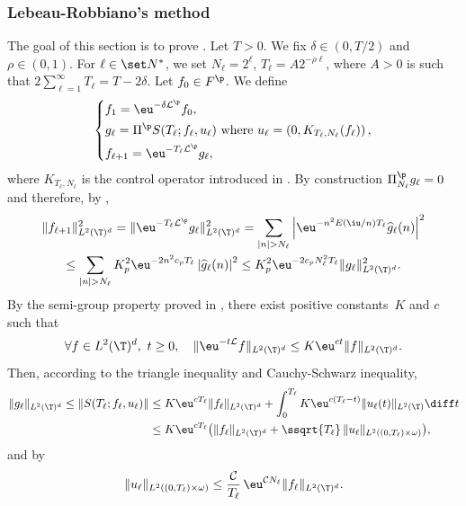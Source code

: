 \subsubsection{Lebeau-Robbiano's method} \label{Subsec:LR}

The goal of this section is to prove . Let $T>0$.
We fix $\delta \in (0,T/2)$ and $\rho \in (0,1)$.
For $\ell \in \set N^*$, we set $N_\ell=2^\ell$, $T_{\ell}=A2^{-\rho \ell}$, where $A>0$ is such that $2\sum_{\ell=1}^\infty T_\ell = T - 2\delta$.
Let $f_0 \in F^\p$. We define
\[
\left\lbrace\begin{aligned}
& f_1=\eu^{-\delta \mathcal{L}^\p} f_0, \\
& g_\ell = \Pi^\p S(T_\ell ; f_\ell, u_\ell) \text{ where } u_\ell = \left(0,K_{T_\ell,N_\ell}(f_\ell)\right), \\
& f_{\ell+1}=\eu^{-T_\ell \mathcal{L}^\p} g_\ell,
\end{aligned}\right.
\]
where $K_{T_\ell,N_\ell}$ is the control operator introduced in . By construction $\Pi^\p_{N_\ell} g_\ell=0$ and therefore, by ,
\begin{multline*}
\|f_{\ell+1}\|_{L^2(\T)^d}^2 = \| \eu^{-T_\ell \mathcal{L}^\p} g_\ell \|_{L^2(\T)^d}^2
= \sum_{|n|>N_\ell} \left\lvert \eu^{-n^2 E(\iu/n)T_\ell} \widehat{g}_\ell(n) \right\rvert^2 \\
\leq \sum_{|n|>N_\ell} K_p^2 \eu^{-2 n^2 c_p T_\ell} \left\lvert \widehat{g}_\ell(n) \right\rvert^2
\leq K_p^2 \eu^{-2 c_p N_\ell^2 T_\ell} \|g_\ell\|_{L^2(\T)^d}^2.
\end{multline*}
By the semi-group property proved in , there exist positive constants~$K$ and $c$ such that
\[
\forall f \in L^2(\T)^d,\ t\geq 0, \quad \| \eu^{-t\mathcal{L}} f \|_{L^2(\T)^d}\leq K \eu^{ct} \|f\|_{L^2(\T)^d}.
\]
Then, according to the triangle inequality and Cauchy-Schwarz inequality,
\begin{align*}
\|g_\ell\|_{L^2(\T)^d}
\leq \| S(T_\ell ; f_\ell, u_\ell) \|
& \leq K \eu^{cT_\ell} \|f_\ell\|_{L^2(\T)^d} + \int_0^{T_\ell} K \eu^{c(T_\ell-t)} \|u_\ell(t)\|_{L^2(\T)} \diff t \\
& \leq K \eu^{cT_\ell} \bigl(\|f_\ell\|_{L^2(\T)^d} + \ssqrt{T_\ell}\, \|u_\ell\|_{L^2((0,T_\ell)\times\omega)} \bigr),
\end{align*}
and by 
\begin{equation}\label{Control:EstimationL2}
\| u_\ell \|_{L^2((0,T_\ell)\times\omega)} \leq \frac{\mathcal{C}}{T_\ell}\, \eu^{\mathcal{C} N_\ell} \|f_\ell\|_{L^2(\T)^d}.
\end{equation}
